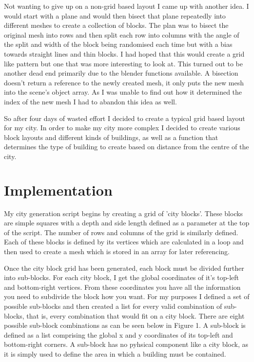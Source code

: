 \documentclass{article}
\begin{document}
Not wanting to give up on a non-grid based layout I came up with another idea. I would start with a plane and would then bisect that plane repeatedly into different meshes to create a collection of blocks. The plan was to bisect the original mesh into rows and then split each row into columns with the angle of the split and width of the block being randomised each time but with a bias towards straight lines and thin blocks. I had hoped that this would create a grid like pattern but one that was more interesting to look at. This turned out to be another dead end primarily due to the blender functions available. A bisection doesn't return a reference to the newly created mesh, it only puts the new mesh into the scene's object array. As I was unable to find out how it determined the index of the new mesh I had to abandon this idea as well.\par

So after four days of wasted effort I decided to create a typical grid based layout for my city. In order to make my city more complex I decided to create various block layouts and different kinds of buildings, as well as a function that determines the type of building to create based on distance from the centre of the city. 

\section{Implementation}

My city generation script begins by creating a grid of 'city blocks'. These blocks are simple squares with a depth and side length defined as a parameter at the top of the script. The number of rows and columns of the grid is similarly defined. Each of these blocks is defined by its vertices which are calculated in a loop and then used to create a mesh which is stored in an array for later referencing.\par

Once the city block grid has been generated, each block must be divided further into sub-blocks. For each city block, I get the global coordinates of it's top-left and bottom-right vertices. From these coordinates you have all the information you need to subdivide the block how you want. For my purposes I defined a set of possible sub-blocks and then created a list for every valid combination of sub-blocks, that is, every combination that would fit on a city block. There are eight possible sub-block combinations as can be seen below in Figure 1. A sub-block is defined as a list comprising the global x and y coordinates of its top-left and bottom-right corners. A sub-block has no pyhsical component like a city block, as it is simply used to define the area in which a building must be contained. \par
\end{document}
